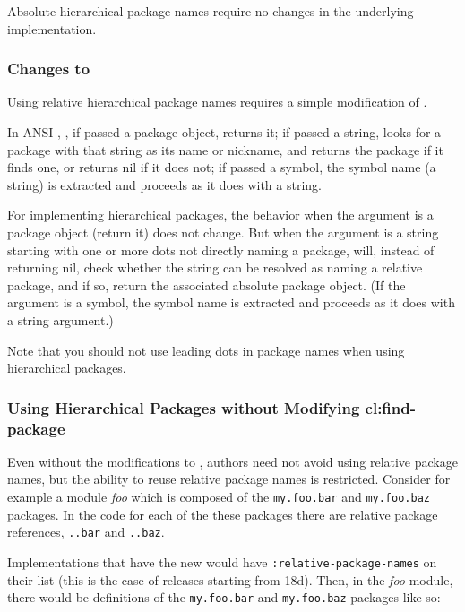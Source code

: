 Absolute hierarchical package names require no changes in the
underlying \clisp{} implementation.


\subsubsection{Changes to }

Using relative hierarchical package names requires a simple
modification of .

In ANSI \clisp{}, , if passed a package object,
returns it; if passed a string,  looks for a
package with that string as its name or nickname, and returns the
package if it finds one, or returns nil if it does not; if passed a
symbol, the symbol name (a string) is extracted and
 proceeds as it does with a string.

For implementing hierarchical packages, the behavior when the argument
is a package object (return it) does not change. But when the argument
is a string starting with one or more dots not directly naming a
package,  will, instead of returning nil, check
whether the string can be resolved as naming a relative package, and
if so, return the associated absolute package object. (If the argument
is a symbol, the symbol name is extracted and 
proceeds as it does with a string argument.)

Note that you should not use leading dots in package names when using
hierarchical packages.

\subsubsection{Using Hierarchical Packages without Modifying cl:find-package}

Even without the modifications to , authors need
not avoid using relative package names, but the ability to reuse
relative package names is restricted. Consider for example a module
\textit{foo} which is composed of the \verb|my.foo.bar| and
\verb|my.foo.baz| packages. In the code for each of the these packages
there are relative package references, \verb|..bar| and \verb|..baz|.

Implementations that have the new  would have
\verb|:relative-package-names| on their 
list (this is the case of \cmucl{} releases starting from 18d). Then,
in the \textit{foo} module, there would be definitions of the
\verb|my.foo.bar| and \verb|my.foo.baz| packages like so:

